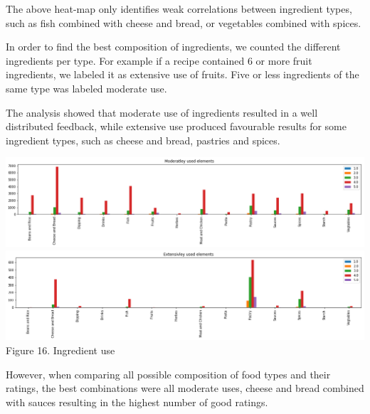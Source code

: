 \documentclass[11pt]{article}
\begin{document}
The above heat-map only identifies weak correlations between ingredient types, such as fish combined with cheese and bread, or vegetables combined with spices.

In order to find the best composition of ingredients, we counted the different ingredients per type. For example if a recipe contained 6 or more fruit ingredients, we labeled it as extensive use of fruits. Five or less ingredients of the same type was labeled moderate use.

The analysis showed that moderate use of ingredients resulted in a well distributed feedback, while extensive use produced favourable results for some ingredient types, such as cheese and bread, pastries and spices. 

\vspace{5mm}
\begin{center}
\includegraphics[scale=0.18]{ingredient-moderate}
\includegraphics[scale=0.18]{ingredient-extensive}
\label{ingredient-use} Figure 16. Ingredient use
\end{center}
\vspace{5mm}

However, when comparing all possible composition of food types and their ratings, the best combinations were all moderate uses, cheese and bread combined with sauces resulting in the highest number of good ratings.
\end{document}
